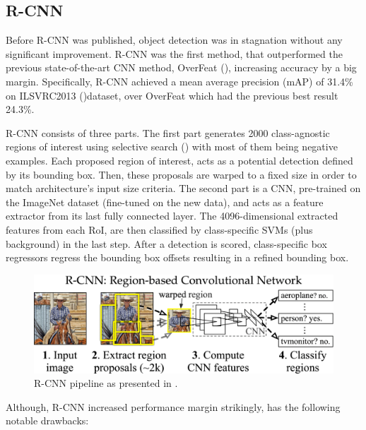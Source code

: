 \subsection{R-CNN}
Before R-CNN was published, object detection was in stagnation without any significant improvement. R-CNN was the first method, that outperformed the previous state-of-the-art CNN method, OverFeat (\cite{sermanet2013overfeat}), increasing accuracy by a big margin. Specifically, R-CNN achieved a mean average precision (mAP) of 31.4\% on ILSVRC2013 (\cite{deng2009imagenet})dataset, over OverFeat which had the previous best result 24.3\%.

R-CNN consists of three parts. The first part generates 2000 class-agnostic regions of interest using selective search (\cite{uijlings2013selective}) with most of them being negative examples. Each proposed region of interest, acts as a potential detection defined by its bounding box. Then, these proposals are warped to a fixed size in order to match architecture's input size criteria. 
The second part is a CNN, pre-trained on the ImageNet dataset (fine-tuned on the new data), and acts as a feature extractor from its last fully connected layer.
The 4096-dimensional extracted features from each RoI, are then classified by class-specific SVMs (plus background) in the last step. After a detection is scored, class-specific box regressors regress the bounding box offsets resulting in a refined bounding box.

\begin{figure}[!htb]
  \centering
  \includegraphics[width=12cm]{../figures/ch2/fig2.png}
  \caption{R-CNN pipeline as presented in \cite{girshick2014rich}.}
  \label{fig2}
\end{figure}

Although, R-CNN increased performance margin strikingly, has the following notable drawbacks:

